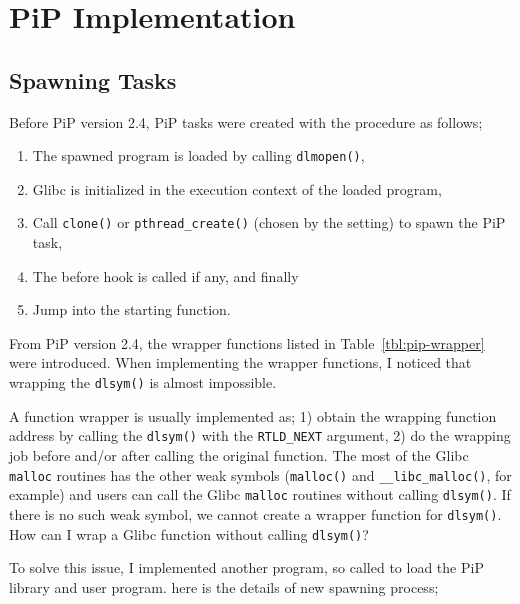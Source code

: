 
\section{PiP Implementation}

\subsection{Spawning Tasks}\label{sec:spawn-details}

Before PiP version 2.4, PiP tasks were created with the procedure as
follows;

\begin{enumerate}
\item The spawned program is loaded by calling {\tt dlmopen()},
\item Glibc is initialized in the execution context of the loaded
  program,
\item Call {\tt clone()} or {\tt pthread_create()} (chosen by the
   setting) to spawn the PiP task,
\item The before hook is called if any, and finally
\item Jump into the starting function.
\end{enumerate}

From PiP version 2.4, the wrapper functions listed in
Table~\ref{tbl:pip-wrapper} were introduced. When implementing the
wrapper functions, I noticed that wrapping the {\tt dlsym()} is
almost impossible.

A function wrapper is usually implemented as; 1) obtain the wrapping
function address by calling the {\tt dlsym()} with the {\tt RTLD_NEXT}
argument, 2) do the wrapping job before and/or after calling the
original function. The most of the Glibc {\tt malloc} routines has
the other weak symbols ({\tt malloc()} and {\tt __libc_malloc()}, for
example) and users can call the Glibc {\tt malloc} routines without
calling {\tt dlsym()}. If there is no such weak symbol, we cannot
create a wrapper function for {\tt dlsym()}. How can I
wrap a Glibc function without calling {\tt dlsym()}?

To solve this issue, I implemented another program, so called
 to load the PiP library and user program. here is
the details of new spawning process;


